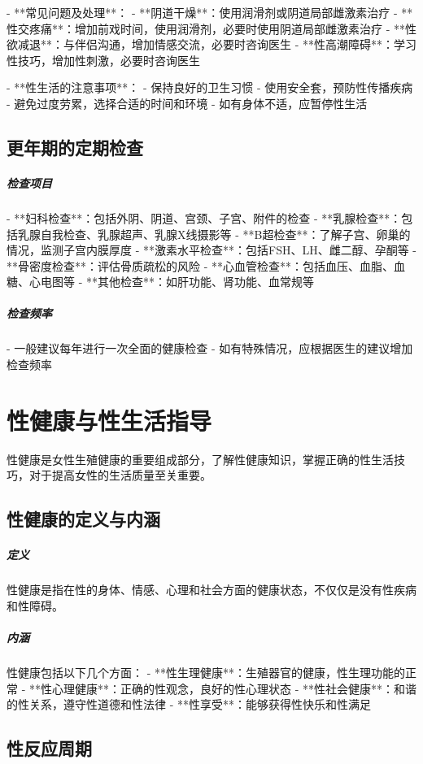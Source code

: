 \begin{enumerate}
- **常见问题及处理**：
  - **阴道干燥**：使用润滑剂或阴道局部雌激素治疗
  - **性交疼痛**：增加前戏时间，使用润滑剂，必要时使用阴道局部雌激素治疗
  - **性欲减退**：与伴侣沟通，增加情感交流，必要时咨询医生
  - **性高潮障碍**：学习性技巧，增加性刺激，必要时咨询医生

- **性生活的注意事项**：
  - 保持良好的卫生习惯
  - 使用安全套，预防性传播疾病
  - 避免过度劳累，选择合适的时间和环境
  - 如有身体不适，应暂停性生活

\subsection{更年期的定期检查}

\subparagraph{检查项目}

- **妇科检查**：包括外阴、阴道、宫颈、子宫、附件的检查
- **乳腺检查**：包括乳腺自我检查、乳腺超声、乳腺X线摄影等
- **B超检查**：了解子宫、卵巢的情况，监测子宫内膜厚度
- **激素水平检查**：包括FSH、LH、雌二醇、孕酮等
- **骨密度检查**：评估骨质疏松的风险
- **心血管检查**：包括血压、血脂、血糖、心电图等
- **其他检查**：如肝功能、肾功能、血常规等

\subparagraph{检查频率}

- 一般建议每年进行一次全面的健康检查
- 如有特殊情况，应根据医生的建议增加检查频率

\section{性健康与性生活指导}

性健康是女性生殖健康的重要组成部分，了解性健康知识，掌握正确的性生活技巧，对于提高女性的生活质量至关重要。

\subsection{性健康的定义与内涵}

\subparagraph{定义}
性健康是指在性的身体、情感、心理和社会方面的健康状态，不仅仅是没有性疾病和性障碍。

\subparagraph{内涵}

性健康包括以下几个方面：
- **性生理健康**：生殖器官的健康，性生理功能的正常
- **性心理健康**：正确的性观念，良好的性心理状态
- **性社会健康**：和谐的性关系，遵守性道德和性法律
- **性享受**：能够获得性快乐和性满足

\subsection{性反应周期}


\end{enumerate}
